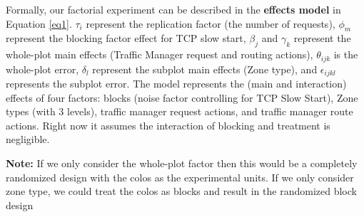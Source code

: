 \documentclass{article}
\begin{document}
Formally, our factorial experiment can be described in the \textbf{effects model} in Equation \ref{eq1}. $\tau_{i}$ represent the replication factor (the number of requests),  $\phi_m$ represent the blocking factor effect for TCP slow start, $\beta_{j}$ and $\gamma_k$ represent the whole-plot main effects (Traffic Manager request and routing actions), $\theta_{ijk}$ is the whole-plot error, $\delta_{l}$ represent the subplot main effects (Zone type), and $\epsilon_{ijkl}$ represents the subplot error. The model represents the (main and interaction) effects of four factors: blocks (noise factor controlling for TCP Slow Start), Zone types (with 3 levels), traffic manager request actions, and traffic manager route actions. Right now it assumes the interaction of blocking and treatment is negligible.

\begin{tcolorbox}
\textbf{Note: } If we only consider the whole-plot factor then this would be a completely randomized design with the colos as the experimental units. If we only consider zone type, we could treat the colos as blocks and result in the randomized block design
\end{tcolorbox}
\end{document}
